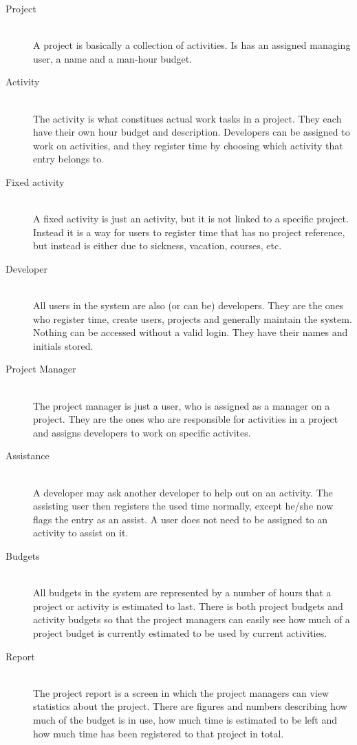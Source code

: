 \begin{description}
\item[Project] \hfill \\
A project is basically a collection of activities. Is has an assigned managing user, a name and a man-hour budget.  

\item[Activity] \hfill \\
The activity is what constitues actual work tasks in a project. They each have their own hour budget and description. Developers can be assigned to work on activities, and they register time by choosing which activity that entry belongs to.

\item[Fixed activity] \hfill \\
A fixed activity is just an activity, but it is not linked to a specific project. Instead it is a way for users to register time that has no project reference, but instead is either due to sickness, vacation, courses, etc.

\item[Developer] \hfill \\
All users in the system are also (or can be) developers. They are the ones who register time, create users, projects and generally maintain the system. Nothing can be accessed without a valid login. They have their names and initials stored.

\item[Project Manager] \hfill \\
The project manager is just a user, who is assigned as a manager on a project. They are the ones who are responsible for activities in a project and assigns developers to work on specific activites.

\item[Assistance] \hfill \\
A developer may ask another developer to help out on an activity. The assisting user then registers the used time normally, except he/she now flags the entry as an assist. A user does not need to be assigned to an activity to assist on it.

\item[Budgets] \hfill \\
All budgets in the system are represented by a number of hours that a project or activity is estimated to last. There is both project budgets and activity budgets so that the project managers can easily see how much of a project budget is currently estimated to be used by current activities.

\item[Report] \hfill \\
The project report is a screen in which the project managers can view statistics about the project. There are figures and numbers describing how much of the budget is in use, how much time is estimated to be left and how much time has been registered to that project in total.

\end{description}